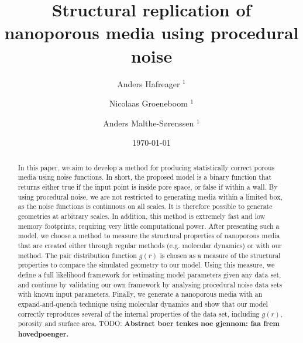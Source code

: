 \documentclass[aps,pre,twocolumn,letterpaper,floatfix,showpacs]{revtex4}
\newcommand{\todo}[1]{ {\color{Magenta} TODO: \color{Blue} \textbf{#1} }}
\begin{document}
\title{Structural replication of nanoporous media using procedural noise}
\author{Anders Hafreager $^{1}$} 
\author{Nicolaas Groeneboom $^{1}$} 
\author{Anders Malthe-S\o renssen $^1$}
\date{\today} 

\begin{abstract} 
In this paper, we aim to develop a method for producing statistically correct porous media using noise functions. In short, the proposed model is a binary function that returns either true if the input point is inside pore space, or false if within a wall. By using procedural noise, we are not restricted to generating media within a limited box, as the noise functions is continuous on all scales. It is therefore possible to generate geometries at arbitrary scales. In addition, this method is extremely fast and low memory footprints, requiring very little computational power. After presenting such a model, we choose a method to measure the structural properties of nanoporous media that are created either through regular methods (e.g. molecular dynamics) or with our method. The pair distribution function $g(r)$ is chosen as a measure of the structural properties to compare the simulated geometry to our model. Using this measure, we define a full likelihood framework for estimating model parameters given any data set, and continue by validating our own framework by analysing procedural noise data sets with known input parameters. Finally, we generate a nanoporous media with an expand-and-quench technique using molecular dynamics and show that our model correctly reproduces several of the internal properties of the data set, including $g(r)$, porosity and surface area.  \todo{Abstract boer tenkes noe gjennom: faa frem hovedpoenger.}   

\end{abstract} 
 
\maketitle
 
\end{document}
